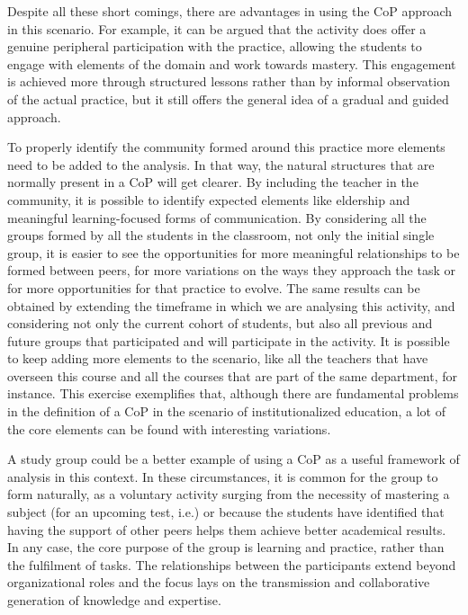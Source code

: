 Despite all these short comings, there are advantages in using the CoP approach in this scenario. For example, it can be argued that the activity does offer a genuine peripheral participation with the practice, allowing the students to engage with
elements of the domain and work towards mastery. This engagement is achieved more through structured lessons rather than by informal observation of the actual practice, but it still offers the general idea of a gradual and guided approach.

To properly identify the community formed around this practice more elements need to be added to the analysis. In that way, the natural structures that are normally present in a \ac{CoP} will get clearer. By including the teacher in the community, it
is possible to identify expected elements like eldership and meaningful learning-focused forms of communication. By considering all the groups formed by all the students in the classroom, not only the initial single group, it is easier to see the
opportunities for more meaningful relationships to be formed between peers, for more variations on the ways they approach the task or for more opportunities for that practice to evolve. The same results can be obtained by extending the timeframe in
which we are analysing this activity, and considering not only the current cohort of students, but also all previous and future groups that participated and will participate in the activity. It is possible to keep adding more elements to the scenario,
like all the teachers that have overseen this course and all the courses that are part of the same department, for instance. This exercise exemplifies that, although there are fundamental problems in the definition of a \ac{CoP} in the scenario of
institutionalized education, a lot of the core elements can be found with interesting variations.

A study group could be a better example of using a \ac{CoP} as a useful framework of analysis in this context. In these circumstances, it is common for the group to form naturally, as a voluntary activity surging from the necessity of mastering a subject
(for an upcoming test, i.e.) or because the students have identified that having the support of other peers helps them achieve better academical results. In any case, the core purpose of the group is learning and practice, rather than the fulfilment of
tasks. The relationships between the participants extend beyond organizational roles and the focus lays on the transmission and collaborative generation of knowledge and expertise.

